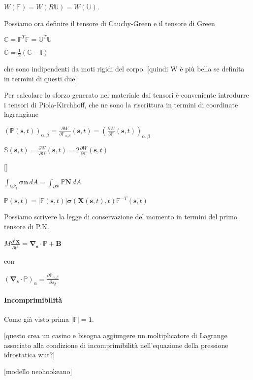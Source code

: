\documentclass{book}
\newcommand{\Nabla}{\boldsymbol{\nabla}}
\begin{document}
$W(\mathbb{F}) = W(R\mathbb{U}) = W(\mathbb{U})$.

Possiamo ora definire il tensore di Cauchy-Green e il tensore di Green

$\mathbb{C} = \mathbb{F}^T\mathbb{F} = \mathbb{U}^T\mathbb{U}$

$\mathbb{G} = \frac{1}{2}(\mathbb{C}-\mathbb{I})$

che sono indipendenti da moti rigidi del corpo. [quindi W è più bella se definita in termini di questi due]

Per calcolare lo sforzo generato nel materiale dai tensori è conveniente introdurre i tensori di Piola-Kirchhoff, che ne sono la riscrittura in termini di coordinate lagrangiane

$(\mathbb{P}(\mathbf{s},t))_{\alpha,\beta} = \frac{\partial W}{\partial \mathbb{F}_{\alpha,\beta}} (\mathbf{s},t) =( \frac{\partial W}{\partial \mathbb{F}} (\mathbf{s},t))_{\alpha,\beta}$

$\mathbb{S}(\mathbf{s},t)=\frac{\partial W}{\partial\mathbb{G}}(\mathbf{s},t)=2\frac{\partial W}{\partial\mathbb{C}}(\mathbf{s},t)$

[]

$\int_{\partial\mathcal{P}_t} \mathbf{\sigma}\mathbf{n} \, dA = \int_{\partial\mathcal{P}} \mathbb{P}\mathbf{N} \, dA$

$\mathbb{P}(\mathbf{s},t) = \vert \mathbb{F}(\mathbf{s},t) \vert \mathbf{\sigma}(\mathbf{X}(\mathbf{s},t),t) \mathbb{F}^{-T}(\mathbf{s},t)$


Possiamo scrivere la legge di conservazione del momento in termini del primo tensore di P.K.

$M\frac{\partial^2\mathbf{X}}{\partial t^2} = \Nabla_\mathbf{s} \cdot \mathbb{P} + \mathbf{B}$

con 

$(\Nabla_\mathbf{s} \cdot \mathbb{P} )_{\alpha} = \frac{\partial\mathbb{P}_{\alpha,\beta}}{\partial s_\beta}$

\paragraph{Incomprimibilità}

Come già visto prima $\vert \mathbb{F} \vert = 1$.

[questo crea un casino e bisogna aggiungere un moltiplicatore di Lagrange associato alla condizione di incomprimibilità nell'equazione della pressione idrostatica wut?]

[modello neohookeano]
\end{document}
